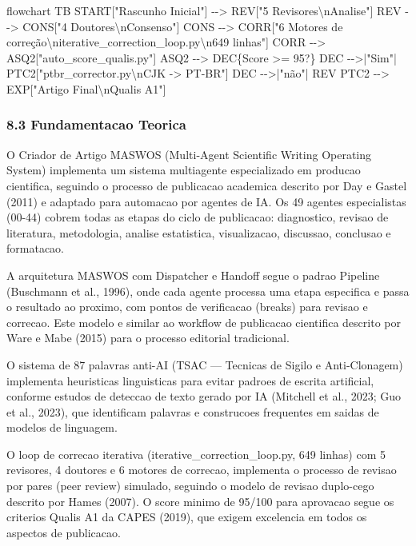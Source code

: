 \documentclass[
  12pt,
]{article}
\newenvironment{Shaded}{}{}
\newcommand{\NormalTok}[1]{#1}
\begin{document}
\begin{Shaded}
\begin{Highlighting}[]
\NormalTok{flowchart TB}
\NormalTok{START["Rascunho Inicial"] {-}{-}\textgreater{} REV["5 Revisores\textbackslash{}nAnalise"]}
\NormalTok{REV {-}{-}\textgreater{} CONS["4 Doutores\textbackslash{}nConsenso"]}
\NormalTok{CONS {-}{-}\textgreater{} CORR["6 Motores de correção\textbackslash{}niterative\_correction\_loop.py\textbackslash{}n649 linhas"]}
\NormalTok{CORR {-}{-}\textgreater{} ASQ2["auto\_score\_qualis.py"]}
\NormalTok{ASQ2 {-}{-}\textgreater{} DEC\{Score \textgreater{}= 95?\}}
\NormalTok{DEC {-}{-}\textgreater{}|"Sim"| PTC2["ptbr\_corrector.py\textbackslash{}nCJK {-}\textgreater{} PT{-}BR"]}
\NormalTok{DEC {-}{-}\textgreater{}|"não"| REV}
\NormalTok{PTC2 {-}{-}\textgreater{} EXP["Artigo Final\textbackslash{}nQualis A1"]}
\end{Highlighting}
\end{Shaded}

\subsubsection{8.3 Fundamentacao Teorica}\label{fundamentacao-teorica-7}

O Criador de Artigo MASWOS (Multi-Agent Scientific Writing Operating
System) implementa um sistema multiagente especializado em producao
cientifica, seguindo o processo de publicacao academica descrito por Day
e Gastel (2011) e adaptado para automacao por agentes de IA. Os 49
agentes especialistas (00-44) cobrem todas as etapas do ciclo de
publicacao: diagnostico, revisao de literatura, metodologia, analise
estatistica, visualizacao, discussao, conclusao e formatacao.

A arquitetura MASWOS com Dispatcher e Handoff segue o padrao Pipeline
(Buschmann et al., 1996), onde cada agente processa uma etapa especifica
e passa o resultado ao proximo, com pontos de verificacao (breaks) para
revisao e correcao. Este modelo e similar ao workflow de publicacao
cientifica descrito por Ware e Mabe (2015) para o processo editorial
tradicional.

O sistema de 87 palavras anti-AI (TSAC --- Tecnicas de Sigilo e
Anti-Clonagem) implementa heuristicas linguisticas para evitar padroes
de escrita artificial, conforme estudos de deteccao de texto gerado por
IA (Mitchell et al., 2023; Guo et al., 2023), que identificam palavras e
construcoes frequentes em saidas de modelos de linguagem.

O loop de correcao iterativa (iterative\_correction\_loop.py, 649
linhas) com 5 revisores, 4 doutores e 6 motores de correcao, implementa
o processo de revisao por pares (peer review) simulado, seguindo o
modelo de revisao duplo-cego descrito por Hames (2007). O score minimo
de 95/100 para aprovacao segue os criterios Qualis A1 da CAPES (2019),
que exigem excelencia em todos os aspectos de publicacao.
\end{document}

